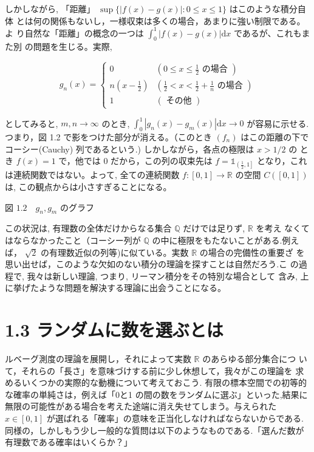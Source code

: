 \documentclass[14pt]{jsarticle}
\begin{document}
しかしながら, 「距離」 $\sup \{|f(x)-g(x)|: 0 \leq x \leq 1\}$ はこのような積分自体 とは何の関係もないし，一様収束は多くの場合，あまりに強い制限である。よ り自然な「距離」の概念の一つは $\int_{0}^{1}|f(x)-g(x)| \mathrm{d} x$ であるが、これもまた別 の問題を生じる。実際,

$$
g_{n}(x)=\left\{\begin{array}{cl}
0 & \left(0 \leq x \leq \frac{1}{2} \text { の場合 }\right) \\
n\left(x-\frac{1}{2}\right) & \left(\frac{1}{2}<x<\frac{1}{2}+\frac{1}{n} \text { の場合 }\right) \\
1 & (\text { その他 })
\end{array}\right.
$$

としてみると, $m, n \rightarrow \infty$ のとき, $\int_{0}^{1}\left|g_{n}(x)-g_{m}(x)\right| \mathrm{d} x \rightarrow 0$ が容易に示せる. つまり，図 1.2 で影をつけた部分が消える。（このとき $\left(f_{n}\right)$ はこの距離の下で コーシー(Cauchy) 列であるという.) しかしながら，各点の極限は $x>1 / 2$ の とき $f(x)=1$ で，他では 0 だから，この列の収束先は $f=\mathbb{1}_{\left(\frac{1}{2}, 1\right]}$ となり，これ は連続関数ではない。よって, 全ての連続関数 $f:[0,1] \rightarrow \mathbb{R}$ の空間 $C([0,1])$ は, この観点からは小さすぎることになる。


図 $1.2 \quad g_{n}, g_{m}$ のグラフ

この状況は, 有理数の全体だけからなる集合 $\mathbb{Q}$ だけでは足りず, $\mathbb{R}$ を考え なくてはならなかったこと（コーシー列が $\mathbb{Q}$ の中に極限をもたないことがある.例えば， $\sqrt{2}$ の有理数近似の列等)に似ている。実数 $\mathbb{R}$ の場合の完備性の重要ざ を思い出せば，このような欠如のない積分の理論を探すことは自然だろう.こ の過程で, 我々は新しい理論, つまり, リーマン積分をその特別な場合として 含み, 上に挙げたような問題を解決する理論に出会うことになる。

\section*{1.3 ランダムに数を選ぶとは}
ルベーグ測度の理論を展開し，それによって実数 $\mathbb{R}$ のあらゆる部分集合につ いて，それらの「長さ」を意味づけする前に少し休想して，我々がこの理論を 求めるいくつかの実際的な動機について考えておこう. 有限の標本空間での初等的な確率の単純さは，例えば「0と1 の間の数をランダムに選ぶ」といった,結果に無限の可能性がある場合を考えた途端に消え失せてしまう。与えられた $x \in[0,1]$ が選ばれる「確率」の意味を正当化しなければならないからである.同様の，しかしもう少し一般的な質問は以下のようなものである.「選んだ数が 有理数である確率はいくらか？」
\end{document}
